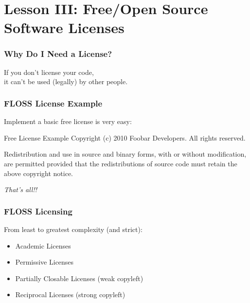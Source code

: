 

\section{Lesson III: Free/Open Source Software Licenses}


\begin{frame}
\frametitle{Why Do I Need a License?}

\pause

\begin{center}
\Large{If you don't license your code,\\ it can't be used (legally) by other people.}
\end{center}

\end{frame}




\begin{frame}
\frametitle{FLOSS License Example}

Implement a basic free license is very easy: 

\begin{block}{Free License Example}
Copyright (c) 2010 Foobar Developers. All rights reserved. 

\medskip
Redistribution and use in source and binary forms, with or without modification, are permitted provided that the redistributions of source code must retain the above copyright notice.
\end{block}

\textit{That's all!!}

\end{frame}



\begin{frame}
\frametitle{FLOSS Licensing}

From least to greatest complexity (and strict):
\begin{itemize}
\item \alert{Academic Licenses}
\item \alert{Permissive Licenses}
\item \alert{Partially Closable Licenses} (weak copyleft)
\item \alert{Reciprocal Licenses} (strong copyleft)
\end{itemize}

\end{frame}

